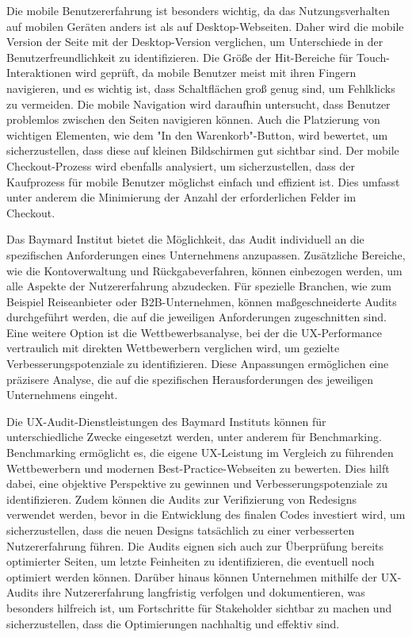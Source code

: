 Die mobile Benutzererfahrung ist besonders wichtig, da das Nutzungsverhalten auf mobilen Geräten anders ist als auf Desktop-Webseiten. Daher wird die mobile Version der Seite mit der Desktop-Version verglichen, um Unterschiede in der Benutzerfreundlichkeit zu identifizieren. Die Größe der Hit-Bereiche für Touch-Interaktionen wird geprüft, da mobile Benutzer meist mit ihren Fingern navigieren, und es wichtig ist, dass Schaltflächen groß genug sind, um Fehlklicks zu vermeiden. Die mobile Navigation wird daraufhin untersucht, dass Benutzer problemlos zwischen den Seiten navigieren können. Auch die Platzierung von wichtigen Elementen, wie dem "In den Warenkorb"-Button, wird bewertet, um sicherzustellen, dass diese auf kleinen Bildschirmen gut sichtbar sind. Der mobile Checkout-Prozess wird ebenfalls analysiert, um sicherzustellen, dass der Kaufprozess für mobile Benutzer möglichst einfach und effizient ist. Dies umfasst unter anderem die Minimierung der Anzahl der erforderlichen Felder im Checkout.

Das Baymard Institut bietet die Möglichkeit, das Audit individuell an die spezifischen Anforderungen eines Unternehmens anzupassen. Zusätzliche Bereiche, wie die Kontoverwaltung und Rückgabeverfahren, können einbezogen werden, um alle Aspekte der Nutzererfahrung abzudecken. Für spezielle Branchen, wie zum Beispiel Reiseanbieter oder B2B-Unternehmen, können maßgeschneiderte Audits durchgeführt werden, die auf die jeweiligen Anforderungen zugeschnitten sind. Eine weitere Option ist die Wettbewerbsanalyse, bei der die UX-Performance vertraulich mit direkten Wettbewerbern verglichen wird, um gezielte Verbesserungspotenziale zu identifizieren. Diese Anpassungen ermöglichen eine präzisere Analyse, die auf die spezifischen Herausforderungen des jeweiligen Unternehmens eingeht.

Die UX-Audit-Dienstleistungen des Baymard Instituts können für unterschiedliche Zwecke eingesetzt werden, unter anderem für Benchmarking. Benchmarking ermöglicht es, die eigene UX-Leistung im Vergleich zu führenden Wettbewerbern und modernen Best-Practice-Webseiten zu bewerten. Dies hilft dabei, eine objektive Perspektive zu gewinnen und Verbesserungspotenziale zu identifizieren. Zudem können die Audits zur Verifizierung von Redesigns verwendet werden, bevor in die Entwicklung des finalen Codes investiert wird, um sicherzustellen, dass die neuen Designs tatsächlich zu einer verbesserten Nutzererfahrung führen. Die Audits eignen sich auch zur Überprüfung bereits optimierter Seiten, um letzte Feinheiten zu identifizieren, die eventuell noch optimiert werden können. Darüber hinaus können Unternehmen mithilfe der UX-Audits ihre Nutzererfahrung langfristig verfolgen und dokumentieren, was besonders hilfreich ist, um Fortschritte für Stakeholder sichtbar zu machen und sicherzustellen, dass die Optimierungen nachhaltig und effektiv sind.


